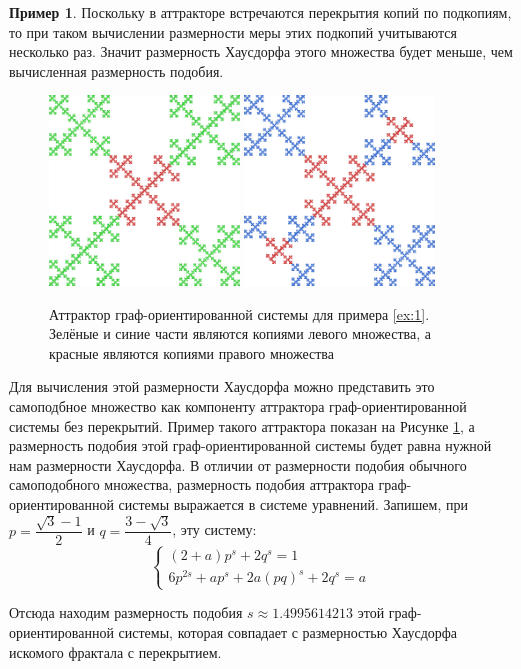 \documentclass[a4paper,14pt]{extarticle} %
\newcommand{\0}{\varnothing}
\newcommand{\8}{\infty}
\theoremstyle{definition}
\newtheorem{example}{Пример}
\begin{document}
\begin{example}
Поскольку в аттракторе встречаются перекрытия копий по подкопиям, то при таком вычислении размерности меры этих подкопий учитываются несколько раз. 
Значит размерность Хаусдорфа этого множества будет меньше, чем вычисленная размерность подобия. 

\begin{figure}[H]
    \centering
    \includegraphics[width=0.45\textwidth]{3_2_1.png}
    \hfill
    \includegraphics[width=0.45\textwidth]{3_2_2.png}
    \begin{minipage}{0.85\textwidth}
        \caption{Аттрактор граф-ориентированной системы для примера \ref{ex:1}. Зелёные и синие части являются копиями левого множества, а красные являются копиями правого множества}
        \label{fig:primer1_1_2}
    \end{minipage}
\end{figure}


Для вычисления этой размерности Хаусдорфа можно представить это самоподбное множество как компоненту аттрактора граф-ори\-ен\-ти\-ро\-ван\-ной системы без перекрытий. 
Пример такого аттрактора показан на Рисунке \ref{fig:primer1_1_2}, а размерность подобия этой граф-ори\-ен\-ти\-ро\-ван\-ной системы будет равна нужной нам размерности Хаусдорфа.
В отличии от размерности подобия обычного самоподобного множества, размерность подобия аттрактора граф-ори\-ен\-ти\-ро\-ван\-ной системы выражается в системе уравнений.
Запишем, при $p=\dfrac{\sqrt{3}-1}{2}$ и $q=\dfrac{3-\sqrt{3}}{4}$, эту систему:
$$
\begin{cases}
(2+a)p^s+2q^s=1\\
6p^{2s}+ap^s+2a(pq)^s+2q^s=a
\end{cases}
$$

Отсюда находим размерность подобия $s\approx1.4995614213$ этой граф-ориентированной системы, которая совпадает с размерностью Хаусдорфа искомого фрактала с перекрытием. 
\end{example}
\end{document}

